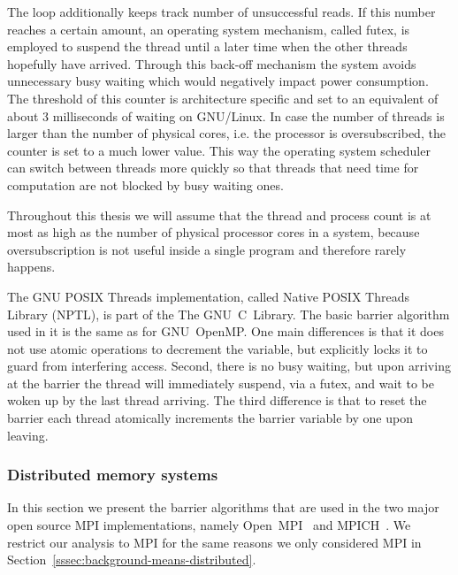 \documentclass[a4paper, 10pt]{article}
\begin{document}
The loop additionally keeps track number of unsuccessful reads. If this number reaches a certain amount, an operating system mechanism, called futex\cite{franke2002}, is employed to suspend the thread until a later time when the other threads hopefully have arrived. Through this back-off mechanism the system avoids unnecessary busy waiting which would negatively impact power consumption. The threshold of this counter is architecture specific and set to an equivalent of about 3 milliseconds of waiting on GNU/Linux. In case the number of threads is larger than the number of physical cores, i.e. the processor is oversubscribed, the counter is set to a much lower value. This way the operating system scheduler can switch between threads more quickly so that threads that need time for computation are not blocked by busy waiting ones.

Throughout this thesis we will assume that the thread and process count is at most as high as the number of physical processor cores in a system, because oversubscription is not useful inside a single program and therefore rarely happens.

The GNU POSIX Threads implementation, called Native POSIX Threads Library (NPTL), is part of the The GNU~C~Library.
The basic barrier algorithm used in it is the same as for GNU~OpenMP. One main differences is that it does not use atomic operations to decrement the variable, but explicitly locks it to guard from interfering access. Second, there is no busy waiting, but upon arriving at the barrier the thread will immediately suspend, via a futex, and wait to be woken up by the last thread arriving. The third difference is that to reset the barrier each thread atomically increments the barrier variable by one upon leaving.

\subsubsection{Distributed memory systems}
\label{sssec:background-currently-used-distributed}

In this section we present the barrier algorithms that are used in the two major open source MPI implementations, namely Open~MPI~\cite{openmpi} and MPICH~\cite{mpich}. We restrict our analysis to MPI for the same reasons we only considered MPI in Section~\ref{sssec:background-means-distributed}.
\end{document}
